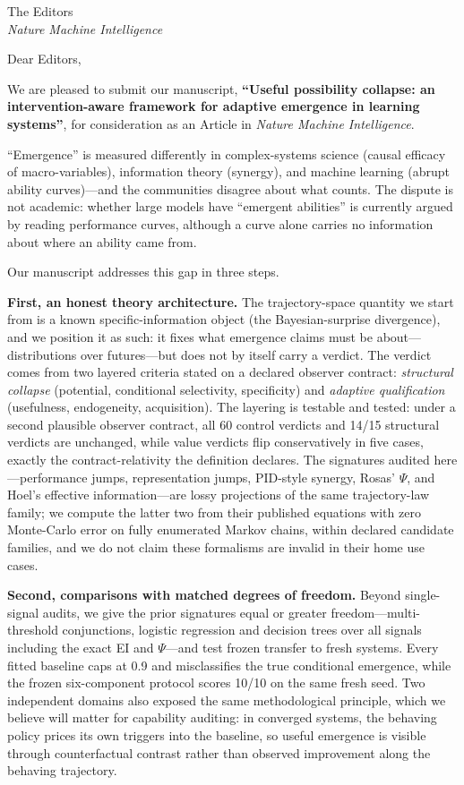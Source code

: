 \documentclass[11pt]{article}
\begin{document}
\noindent
[Date]

\noindent
The Editors\\
\emph{Nature Machine Intelligence}

\bigskip
\noindent
Dear Editors,

We are pleased to submit our manuscript, \textbf{``Useful possibility
collapse: an intervention-aware framework for adaptive emergence in
learning systems''}, for consideration as an Article in \emph{Nature
Machine Intelligence}.

``Emergence'' is measured differently in complex-systems science
(causal efficacy of macro-variables), information theory (synergy),
and machine learning (abrupt ability curves)---and the communities
disagree about what counts. The dispute is not academic: whether large
models have ``emergent abilities'' is currently argued by reading
performance curves, although a curve alone carries no information
about where an ability came from.

Our manuscript addresses this gap in three steps.

\textbf{First, an honest theory architecture.} The trajectory-space
quantity we start from is a known specific-information object (the
Bayesian-surprise divergence), and we position it as such: it fixes
what emergence claims must be about---distributions over futures---but
does not by itself carry a verdict. The verdict comes from two layered
criteria stated on a declared observer contract: \emph{structural
collapse} (potential, conditional selectivity, specificity) and
\emph{adaptive qualification} (usefulness, endogeneity, acquisition).
The layering is testable and tested: under a second plausible observer
contract, all 60 control verdicts and 14/15 structural verdicts are
unchanged, while value verdicts flip conservatively in five cases,
exactly the contract-relativity the definition declares. The signatures
audited here---performance jumps, representation jumps, PID-style
synergy, Rosas' $\Psi$, and Hoel's effective information---are lossy
projections of the same trajectory-law family; we compute the latter
two from their published equations with zero Monte-Carlo error on
fully enumerated Markov chains, within declared candidate families,
and we do not claim these formalisms are invalid in their home use
cases.

\textbf{Second, comparisons with matched degrees of freedom.} Beyond
single-signal audits, we give the prior signatures equal or greater
freedom---multi-threshold conjunctions, logistic regression and
decision trees over all signals including the exact EI and
$\Psi$---and test frozen transfer to fresh systems. Every fitted
baseline caps at 0.9 and misclassifies the true conditional emergence,
while the frozen six-component protocol scores 10/10 on the same fresh
seed. Two independent domains also exposed the same methodological
principle, which we believe will matter for capability auditing: in
converged systems, the behaving policy prices its own triggers into
the baseline, so useful emergence is visible through counterfactual
contrast rather than observed improvement along the behaving
trajectory.
\end{document}
